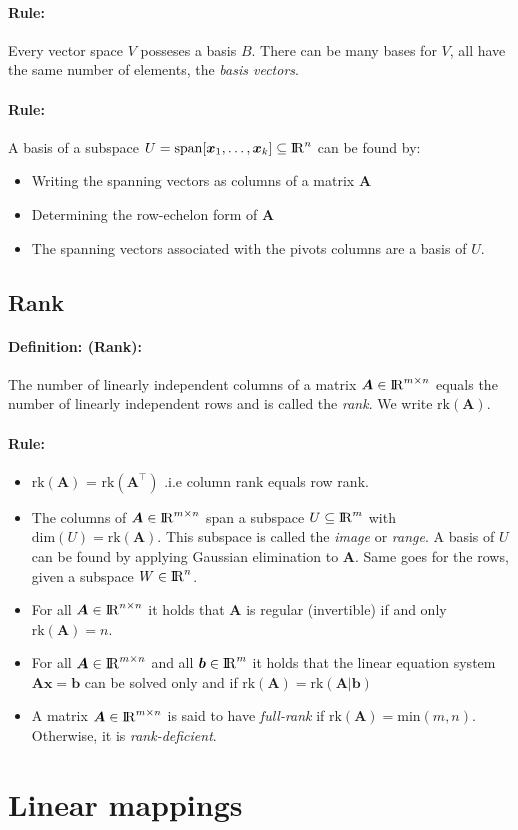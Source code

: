\documentclass[12pt]{article}
\newcommand{\R}{{\rm I\!R}}
\newcommand{\A}{{\bm{A}}}
\newcommand{\vecs}[2]{{\bm{#1}_1, \dots, \bm{#1}_#2}}
\newcommand{\xdefinition}[2]{\paragraph{\colorbox{#1!30}{\textbf{Definition:}} (#2):}}
\newcommand{\xrule}[1]{\paragraph{\colorbox{#1!30}{\textbf{Rule:}}}}
\begin{document}
\xrule{green} Every vector space $V$ posseses a basis $B$. There can be many bases for $V$, all have the same number of elements, the \textit{basis vectors}.

\xrule{green} A basis of a subspace $U = \text{span}[\vecs{x}{k}] \subseteq \R^n$ can be found by:
%
\begin{itemize}
	\item Writing the spanning vectors as columns of a matrix $\A$
	\item Determining the row-echelon form of $\A$
	\item The spanning vectors associated with the pivots columns are a basis of $U$. 
\end{itemize}

\subsection{Rank}

\xdefinition{green}{Rank} The number of linearly independent columns of a matrix $\A \in \R^{m \times n}$ equals the number of linearly independent rows and is called the \textit{rank}. We write $\text{rk}(\A)$.

\xrule{blue}
%
\begin{itemize}
	\item $\text{rk}(\A)$ = $\text{rk}(\A^\top)$ .i.e column rank equals row rank.
	\item The columns of $\A \in \R^{m \times n}$ span a subspace $U \subseteq \R^m$ with $\text{dim}(U) = \text{rk}(\A)$. This subspace is called the \textit{image} or \textit{range}. A basis of $U$ can be found by applying Gaussian elimination to $\A$. Same goes for the rows, given a subspace $W \in \R^n$.	
	\item For all $\A \in \R^{n \times n}$ it holds that $\A$ is regular (invertible) if and only $\text{rk}(\A) = n$.
	\item For all $\A \in \R^{m \times n}$ and all $\bm{b} \in \R^m$ it holds that the linear equation system $\A \bm{x} = \bm{b}$ can be solved only and if $\text{rk}(\A) = \text{rk}(\A | \bm{b})$
	\item A matrix $\A \in \R^{m \times n}$ is said to have \textit{full-rank} if $\text{rk}(\A) = \text{min}(m, n)$. Otherwise, it is \textit{rank-deficient}.
\end{itemize}

\section{Linear mappings}
\end{document}
